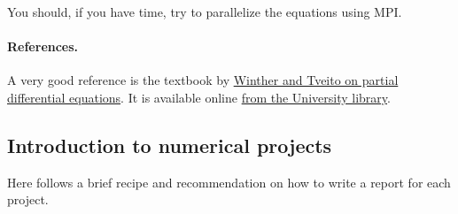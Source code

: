\documentclass[%
oneside,                 %
final,                   %
10pt]{article}
\begin{document}
You should, if you have time, try to  parallelize the equations using MPI. 


\paragraph{References.}
A very good reference is the textbook by \href{{http://www.springer.com/us/book/9783540225515}}{Winther and Tveito on partial differential equations}. It is available online \href{{https://vpn2.uio.no/+CSCO+0h756767633A2F2F797661782E66636576617472652E70627A++/book/10.1007/b138016/page/1}}{from the University library}.


\subsection*{Introduction to numerical projects}

Here follows a brief recipe and recommendation on how to write a report for each
project.
\end{document}
